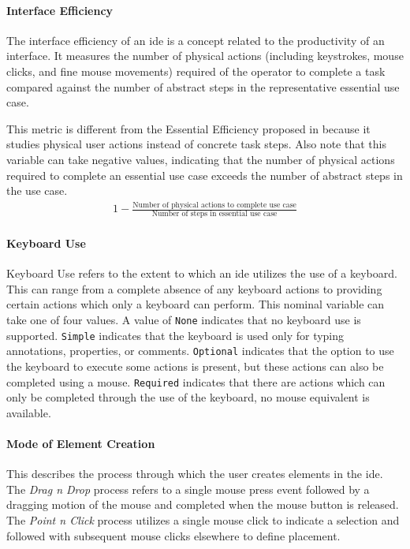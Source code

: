 \paragraph{Interface Efficiency} The interface efficiency of an \ac{ide} is a
concept related to the productivity of an interface. It measures the number
of physical actions (including keystrokes, mouse clicks, and fine mouse
movements) required of the operator to complete a task compared against
the number of abstract steps in the representative essential use case.

This metric is different from the Essential Efficiency proposed in
\cite{constantine1996} because it studies physical user actions instead of
concrete task steps. Also note that this variable can take negative values,
indicating that the number of physical actions required to complete an
essential use case exceeds the number of abstract steps in the use case.
%
\begin{align}\label{eq:iefficiency}
  1 - \frac{\text{Number of physical actions to complete use case}}
            {\text{Number of steps in essential use case}}
\end{align}


\paragraph{Keyboard Use} Keyboard Use refers to the extent to which an \ac{ide}
utilizes the use of a keyboard. This can range from a complete absence of
any keyboard actions to providing certain actions which only a keyboard can
perform. This nominal variable can take one of four values. A value of
\texttt{None} indicates that no keyboard use is supported. \texttt{Simple}
indicates that the keyboard is used only for typing annotations,
properties, or comments. \texttt{Optional} indicates that the option to use
the keyboard to execute some actions is present, but these actions can also
be completed using a mouse. \texttt{Required} indicates that there are
actions which can only be completed through the use of the keyboard, no
mouse equivalent is available.


\paragraph{Mode of Element Creation} This describes the process through
which the user creates elements in the \ac{ide}. The \emph{Drag n Drop} process
refers to a single mouse press event followed by a dragging motion of the
mouse and completed when the mouse button is released. The \emph{Point n
Click} process utilizes a single mouse click to indicate a selection and
followed with subsequent mouse clicks elsewhere to define placement.

